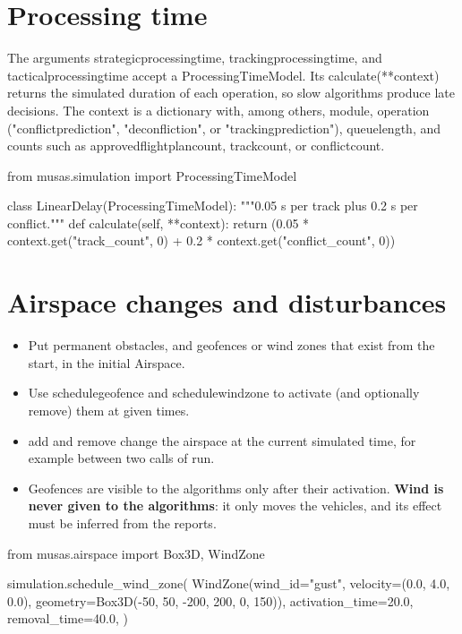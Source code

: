 \documentclass[11pt,a4paper,oneside]{report}
\newcommand{\code}[1]{\textcolor{primary!85!black}{\ttfamily\def\_{\textunderscore\allowbreak}#1}}
\begin{document}
\section{Processing time}

The arguments \code{strategic\_processing\_time},
\code{tracking\_processing\_time}, and \code{tactical\_processing\_time} accept
a \code{ProcessingTimeModel}. Its \code{calculate(**context)} returns the
simulated duration of each operation, so slow algorithms produce late
decisions. The context is a dictionary with, among others, \code{module},
\code{operation} (\code{"conflict\_prediction"}, \code{"deconfliction"}, or
\code{"tracking\_prediction"}), \code{queue\_length}, and counts such as
\code{approved\_flight\_plan\_count}, \code{track\_count}, or
\code{conflict\_count}.

\begin{pycode}
from musas.simulation import ProcessingTimeModel

class LinearDelay(ProcessingTimeModel):
    """0.05 s per track plus 0.2 s per conflict."""
    def calculate(self, **context):
        return (0.05 * context.get("track_count", 0)
                + 0.2 * context.get("conflict_count", 0))
\end{pycode}

\section{Airspace changes and disturbances}

\begin{itemize}
  \item Put permanent obstacles, and geofences or wind zones that exist from
    the start, in the initial \code{Airspace}.
  \item Use \code{schedule\_geofence} and \code{schedule\_wind\_zone} to
    activate (and optionally remove) them at given times.
  \item \code{add\_*} and \code{remove\_*} change the airspace at the current
    simulated time, for example between two calls of \code{run}.
  \item Geofences are visible to the algorithms only after their activation.
    \textbf{Wind is never given to the algorithms}: it only moves the
    vehicles, and its effect must be inferred from the reports.
\end{itemize}

\begin{pycode}
from musas.airspace import Box3D, WindZone

simulation.schedule_wind_zone(
    WindZone(wind_id="gust", velocity=(0.0, 4.0, 0.0),
             geometry=Box3D(-50, 50, -200, 200, 0, 150)),
    activation_time=20.0, removal_time=40.0,
)
\end{pycode}
\end{document}
